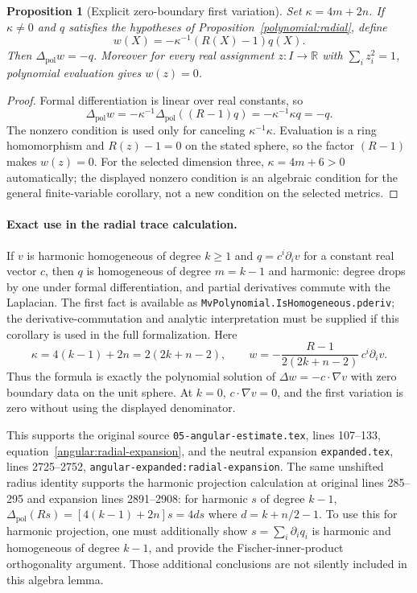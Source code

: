 \documentclass[11pt]{article}
\newtheorem{proposition}[theorem]{Proposition}
\theoremstyle{definition}
\theoremstyle{remark}
\newcommand{\R}{\mathbb R}
\numberwithin{equation}{section}
\providecommand{\Lap}{\Delta_{\mathrm{pol}}}
\begin{document}
\begin{proposition}[Explicit zero-boundary first variation]
\label{polynomial:first-variation}
Set $\kappa=4m+2n$.  If $\kappa\ne0$ and $q$ satisfies the hypotheses
of Proposition~\ref{polynomial:radial}, define
\[
 w(X)=-\kappa^{-1}(R(X)-1)q(X).
\]
Then $\Lap w=-q$.  Moreover for every real assignment $z:I\to\R$
with $\sum_i z_i^2=1$, polynomial evaluation gives $w(z)=0$.
\end{proposition}
\begin{proof}
Formal differentiation is linear over real constants, so
\[
 \Lap w=-\kappa^{-1}\Lap((R-1)q)
 =-\kappa^{-1}\kappa q=-q.
\]
The nonzero condition is used only for canceling $\kappa^{-1}\kappa$.
Evaluation is a ring homomorphism and $R(z)-1=0$ on the stated sphere,
so the factor $(R-1)$ makes $w(z)=0$.  For the selected dimension three,
$\kappa=4m+6>0$ automatically; the displayed nonzero condition is an
algebraic condition for the general finite-variable corollary, not a new
condition on the selected metrics.
\end{proof}

\paragraph{Exact use in the radial trace calculation.}
If $v$ is harmonic homogeneous of degree $k\ge1$ and
$q=c^i\partial_i v$ for a constant real vector $c$, then $q$ is
homogeneous of degree $m=k-1$ and harmonic: degree drops by one under
formal differentiation, and partial derivatives commute with the
Laplacian.  The first fact is available as
\texttt{MvPolynomial.IsHomogeneous.pderiv}; the derivative-commutation
and analytic interpretation must be supplied if this corollary is used in
the full formalization.  Here
\[
 \kappa=4(k-1)+2n=2(2k+n-2),\qquad
 w=-\frac{R-1}{2(2k+n-2)}\,c^i\partial_i v.
\]
Thus the formula is exactly the polynomial solution of
$\Delta w=-c\cdot\nabla v$ with zero boundary data on the unit sphere.
At $k=0$, $c\cdot\nabla v=0$, and the first variation is zero without
using the displayed denominator.

This supports the original source
\texttt{05-angular-estimate.tex}, lines 107--133,
equation~\eqref{angular:radial-expansion}, and the neutral expansion
\texttt{expanded.tex}, lines 2725--2752,
\nolinkurl{angular-expanded:radial-expansion}.  The same unshifted radius
identity supports the harmonic projection calculation at original
lines 285--295 and expansion lines 2891--2908: for harmonic $s$ of
degree $k-1$, $\Lap(Rs)=[4(k-1)+2n]s=4ds$ where
$d=k+n/2-1$.  To use this for harmonic projection, one must additionally
show $s=\sum_i\partial_iq_i$ is harmonic and homogeneous of degree
$k-1$, and provide the Fischer-inner-product orthogonality argument.
Those additional conclusions are not silently included in this algebra
lemma.
\end{document}
